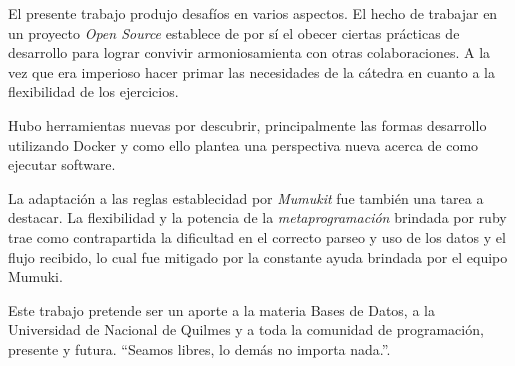 
El presente trabajo produjo desafíos en varios aspectos.
El hecho de trabajar en un proyecto \textit{Open Source}
establece de por sí el obecer ciertas prácticas de desarrollo
para lograr convivir armoniosamienta con otras colaboraciones.
A la vez que era imperioso hacer primar las necesidades
de la cátedra en cuanto a la flexibilidad de los ejercicios.

Hubo herramientas nuevas por descubrir, principalmente
las formas desarrollo utilizando Docker y como ello
plantea una perspectiva nueva acerca de como ejecutar software.

La adaptación a las reglas establecidad por \textit{Mumukit}
fue también una tarea a destacar. La flexibilidad y la potencia
de la \textit{metaprogramación} brindada por ruby
trae como contrapartida la dificultad
en el correcto parseo y uso de los datos y el flujo recibido,
lo cual fue mitigado por la constante ayuda brindada por el equipo Mumuki.

Este trabajo pretende ser un aporte a la materia Bases de Datos,
a la Universidad de Nacional de Quilmes y a toda la comunidad
de programación, presente y futura.
\enquote{Seamos libres, lo demás no importa nada.}.


